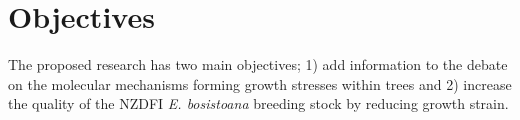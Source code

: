 \section{Objectives}
The proposed research has two main objectives; 1) add information to the
debate on the molecular mechanisms forming growth stresses within trees and 2)
increase the quality of the NZDFI \textit{E.
bosistoana} breeding stock by reducing growth strain.